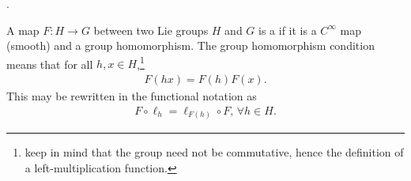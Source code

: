 \documentclass[12pt,a4paper]{report}
\begin{document}
\HLINE
\begin{remark}.

A map $F:H \to G$ between two Lie groups $H$ and $G$ is a  if it is a $C^\infty$ map (smooth) and a group homomorphism.  The group homomorphism condition means that for all $h,x \in H$,\footnote{keep in mind that the group need not be commutative, hence the definition of a left-multiplication function.}
\begin{align*}
	F(hx) = F(h)F(x).
\end{align*}This may be rewritten in the functional notation as 
\begin{align*}
	F\circ \ell_h= \ell_{F(h)} \circ F, \, \forall h \in H.
\end{align*}
\end{remark}
\end{document}

